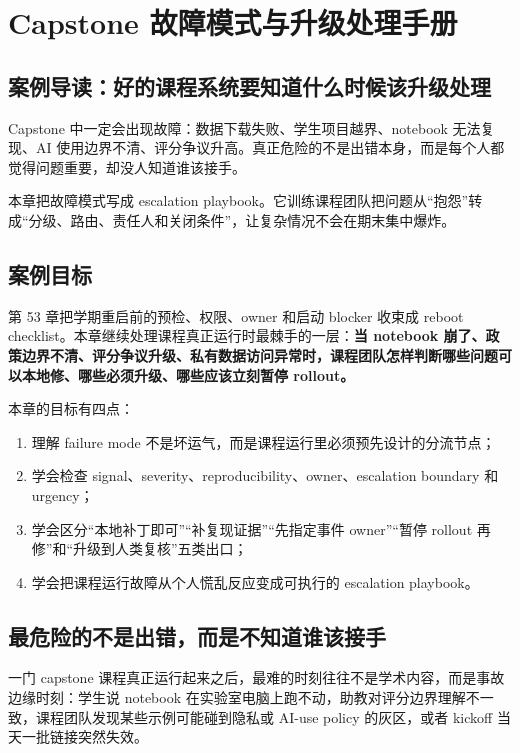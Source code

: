 \chapter{Capstone 故障模式与升级处理手册}

\section{案例导读：好的课程系统要知道什么时候该升级处理}

Capstone 中一定会出现故障：数据下载失败、学生项目越界、notebook 无法复现、AI 使用边界不清、评分争议升高。真正危险的不是出错本身，而是每个人都觉得问题重要，却没人知道谁该接手。

本章把故障模式写成 escalation playbook。它训练课程团队把问题从“抱怨”转成“分级、路由、责任人和关闭条件”，让复杂情况不会在期末集中爆炸。

\section{案例目标}

第 53 章把学期重启前的预检、权限、owner 和启动 blocker 收束成 reboot checklist。本章继续处理课程真正运行时最棘手的一层：\textbf{当 notebook 崩了、政策边界不清、评分争议升级、私有数据访问异常时，课程团队怎样判断哪些问题可以本地修、哪些必须升级、哪些应该立刻暂停 rollout。}

本章的目标有四点：

\begin{enumerate}
    \item 理解 failure mode 不是坏运气，而是课程运行里必须预先设计的分流节点；
    \item 学会检查 signal、severity、reproducibility、owner、escalation boundary 和 urgency；
    \item 学会区分“本地补丁即可”“补复现证据”“先指定事件 owner”“暂停 rollout 再修”和“升级到人类复核”五类出口；
    \item 学会把课程运行故障从个人慌乱反应变成可执行的 escalation playbook。
\end{enumerate}

\section{最危险的不是出错，而是不知道谁该接手}

一门 capstone 课程真正运行起来之后，最难的时刻往往不是学术内容，而是事故边缘时刻：学生说 notebook 在实验室电脑上跑不动，助教对评分边界理解不一致，课程团队发现某些示例可能碰到隐私或 AI-use policy 的灰区，或者 kickoff 当天一批链接突然失效。

